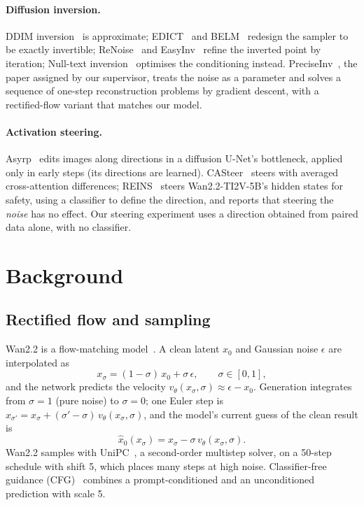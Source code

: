 \documentclass[11pt,a4paper]{article}
\newcommand{\xhat}{\hat{x}_0}
\begin{document}
\paragraph{Diffusion inversion.}
DDIM inversion~\cite{ddim} is approximate; EDICT~\cite{edict} and BELM~\cite{belm} redesign the sampler to be exactly invertible; ReNoise~\cite{renoise} and EasyInv~\cite{easyinv} refine the inverted point by iteration; Null-text inversion~\cite{nulltext} optimises the conditioning instead.
PreciseInv~\cite{preciseinv}, the paper assigned by our supervisor, treats the noise as a parameter and solves a sequence of one-step reconstruction problems by gradient descent, with a rectified-flow variant that matches our model.

\paragraph{Activation steering.}
Asyrp~\cite{asyrp} edits images along directions in a diffusion U-Net's bottleneck, applied only in early steps (its directions are learned).
CASteer~\cite{casteer} steers with averaged cross-attention differences; REINS~\cite{reins} steers Wan2.2-TI2V-5B's hidden states for safety, using a classifier to define the direction, and reports that steering the \emph{noise} has no effect.
Our steering experiment uses a direction obtained from paired data alone, with no classifier.

\section{Background}

\subsection{Rectified flow and sampling}
Wan2.2 is a flow-matching model~\cite{flowmatching,rectflow}.
A clean latent $x_0$ and Gaussian noise $\epsilon$ are interpolated as
\begin{equation}
x_\sigma = (1-\sigma)\,x_0 + \sigma\,\epsilon,\qquad \sigma\in[0,1],
\label{eq:interp}
\end{equation}
and the network predicts the velocity $v_\theta(x_\sigma,\sigma)\approx \epsilon - x_0$.
Generation integrates from $\sigma{=}1$ (pure noise) to $\sigma{=}0$; one Euler step is $x_{\sigma'} = x_\sigma + (\sigma'-\sigma)\,v_\theta(x_\sigma,\sigma)$, and the model's current guess of the clean result is
\begin{equation}
\xhat(x_\sigma) = x_\sigma - \sigma\, v_\theta(x_\sigma,\sigma).
\label{eq:x0}
\end{equation}
Wan2.2 samples with UniPC~\cite{unipc}, a second-order multistep solver, on a 50-step schedule with shift 5, which places many steps at high noise.
Classifier-free guidance (CFG)~\cite{cfg} combines a prompt-conditioned and an unconditioned prediction with scale 5.
\end{document}
